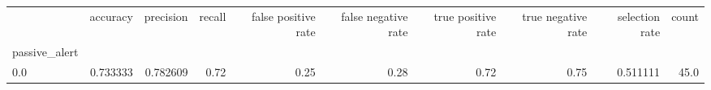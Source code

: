 \begin{tabular}{lrrrrrrrrr}
\toprule
{} &  accuracy &  precision &  recall &  false positive rate &  false negative rate &  true positive rate &  true negative rate &  selection rate &  count \\
passive\_alert &           &            &         &                      &                      &                     &                     &                 &        \\
\midrule
0.0           &  0.733333 &   0.782609 &    0.72 &                 0.25 &                 0.28 &                0.72 &                0.75 &        0.511111 &   45.0 \\
\bottomrule
\end{tabular}
